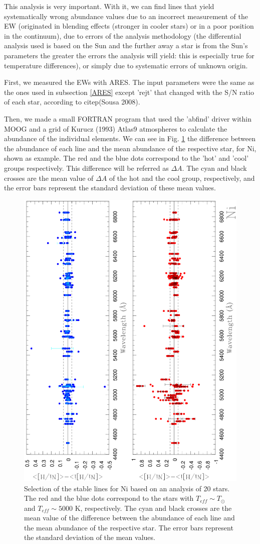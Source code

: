 \documentclass[dvips,12pt,a4paper]{report}
\begin{document}
{This analysis is very important. With it, we can find lines that yield systematically wrong abundance values due to an incorrect measurement of the EW (originated in blending effects (stronger in cooler stars) or in a poor position in the continuum), due to errors of the analysis methodology (the differential analysis used is based on the Sun and the further away a star is from the Sun's parameters the greater the errors the analysis will yield: this is especially true for temperature differences), or simply due to systematic errors of unknown origin.

First, we measured the EWs with ARES. The input parameters were the same as the ones used in subsection \ref{ARES} except 'rejt' that changed with the S/N ratio of each star, according to citep(Sousa 2008). 

Then, we made a small FORTRAN program that used the 'abfind' driver within MOOG and a grid of Kurucz (1993) Atlas9 atmospheres to calculate the abundance of the individual elements. We can see in Fig. \ref{Ni20} the difference between the abundance of each line and the mean abundance of the respective star, for Ni, shown as example. The red and the blue dots correspond to the 'hot' and 'cool' groups respectively. This difference will be referred as $\Delta A$. The cyan and black crosses are the mean value of $\Delta A$ of the hot and the cool group, respectively, and the error bars represent the standard deviation of these mean values. 

\begin{figure}[h]
\centering
\includegraphics[height=13 cm, angle=-90]{pics/Ni20.eps}
\caption[20 star delta ab graphics]{Selection of the stable lines for Ni based on an analysis of 20 stars. The red and the blue dots correspond to the stars with $T_{eff}\sim T_\odot$ and $T_{eff}\sim 5000$ K, respectively. The cyan and black crosses are the mean value of the difference between the abundance of each line and the mean abundance of the respective star. The error bars represent the standard deviation of the mean values.}
\label{Ni20}
\end{figure}

}
\end{document}
